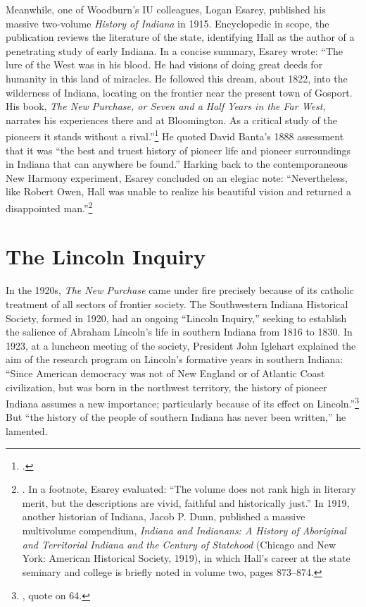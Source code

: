 \documentclass[
  american,
  letterpaper,
]{scrreprt}
\begin{document}
Meanwhile, one of Woodburn's IU colleagues, Logan Esarey, published his
massive two-volume \emph{History of Indiana} in 1915. Encyclopedic in
scope, the publication reviews the literature of the state, identifying
Hall as the author of a penetrating study of early Indiana. In a concise
summary, Esarey wrote: ``The lure of the West was in his blood. He had
visions of doing great deeds for humanity in this land of miracles. He
followed this dream, about 1822, into the wilderness of Indiana,
locating on the frontier near the present town of Gosport. His book,
\emph{The New Purchase, or Seven and a Half Years in the Far West},
narrates his experiences there and at Bloomington. As a critical study
of the pioneers it stands without a rival.''\footnote{.} He quoted David Banta's 1888 assessment that it was
``the best and truest history of pioneer life and pioneer surroundings
in Indiana that can anywhere be found.'' Harking back to the
contemporaneous New Harmony experiment, Esarey concluded on an elegiac
note: ``Nevertheless, like Robert Owen, Hall was unable to realize his
beautiful vision and returned a disappointed man.''\footnote{. In a footnote, Esarey evaluated: ``The
  volume does not rank high in literary merit, but the descriptions are
  vivid, faithful and historically just.'' In 1919, another historian of
  Indiana, Jacob P. Dunn, published a massive multivolume compendium,
  \emph{Indiana and Indianans: A History of Aboriginal and Territorial
  Indiana and the Century of Statehood} (Chicago and New York: American
  Historical Society, 1919), in which Hall's career at the state
  seminary and college is briefly noted in volume two, pages 873--874.}

\section{The Lincoln Inquiry}\label{the-lincoln-inquiry}

In the 1920s, \emph{The New Purchase} came under fire precisely because
of its catholic treatment of all sectors of frontier society. The
Southwestern Indiana Historical Society, formed in 1920, had an ongoing
``Lincoln Inquiry,'' seeking to establish the salience of Abraham
Lincoln's life in southern Indiana from 1816 to 1830. In 1923, at a
luncheon meeting of the society, President John Iglehart explained the
aim of the research program on Lincoln's formative years in southern
Indiana: ``Since American democracy was not of New England or of
Atlantic Coast civilization, but was born in the northwest territory,
the history of pioneer Indiana assumes a new importance; particularly
because of its effect on Lincoln.''\footnote{, quote on 64.} But ``the history of the people of southern
Indiana has never been written,'' he lamented.
\end{document}

